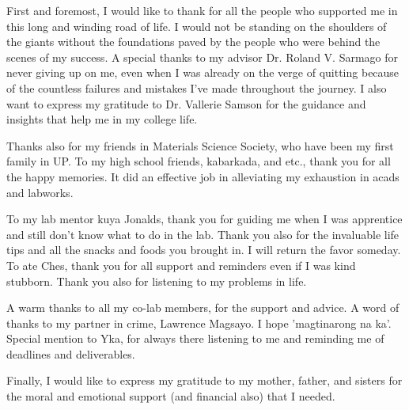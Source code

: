\hspace{\parindent} 
First and foremost, I would like to thank for all the people who supported me in this long and winding road of life. I would not be standing on the shoulders of the giants without the foundations paved by the people who were behind the scenes of my success.  A special thanks to my advisor Dr. Roland V. Sarmago for never giving up on me, even when I was already on the verge of quitting because of the countless failures and mistakes I've made throughout the journey. I also want to express my gratitude to Dr. Vallerie Samson for the guidance and insights that help me  in my college life.


Thanks also for my friends in Materials Science Society, who have been my first family in UP. To my high school friends, kabarkada, and etc., thank you for all the happy memories. It did an effective job in alleviating my exhaustion in acads and labworks. 

To my lab mentor kuya Jonalds, thank you for guiding me when I was apprentice and still don't know what to do in the lab. Thank you also for the invaluable life tips and all the snacks and foods you brought in. I will return the favor someday. To ate Ches, thank you for all support and reminders even if I was kind stubborn. Thank you also for listening to my problems in life. 

A warm thanks to all my co-lab members,  for the support and advice. A word of thanks to my partner in crime, Lawrence Magsayo. I hope 'magtinarong na ka'. Special mention to Yka, for always there listening to me and reminding me of deadlines and deliverables. 

Finally, I would like to express my gratitude to my mother, father, and sisters for the moral and emotional support (and financial also) that I needed. 

